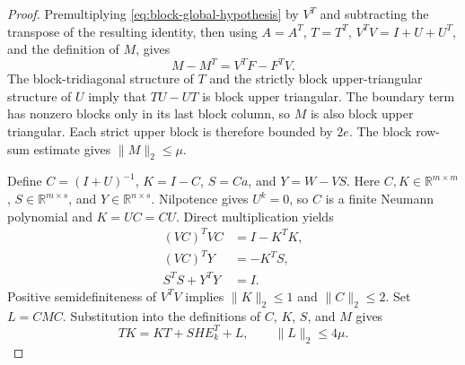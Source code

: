 \documentclass[11pt]{article}
\theoremstyle{definition}
\newcommand{\R}{\mathbb{R}}
\begin{document}
\begin{proof}
Premultiplying \eqref{eq:block-global-hypothesis} by $V^T$ and subtracting the
transpose of the resulting identity, then using $A=A^T$, $T=T^T$,
$V^TV=I+U+U^T$, and the definition of $M$, gives
\begin{equation}
 M-M^T=V^TF-F^TV.
 \label{eq:block-commutator}
\end{equation}
The block-tridiagonal structure of $T$ and the strictly block upper-triangular
structure of $U$ imply that $TU-UT$ is block upper triangular.
The boundary term has nonzero blocks only in its last block column, so
$M$ is also block upper triangular. Each
strict upper block is therefore bounded by $2e$.  The block row-sum estimate
gives $\|M\|_2\le\mu$.

Define $C=(I+U)^{-1}$, $K=I-C$, $S=Ca$, and $Y=W-VS$.
Here $C,K\in\R^{m\times m}$, $S\in\R^{m\times s}$, and $Y\in\R^{n\times s}$.
Nilpotence gives $U^k=0$, so $C$ is a finite Neumann polynomial and
$K=UC=CU$.  Direct multiplication yields
\begin{equation}
\begin{aligned}
 (VC)^TVC&=I-K^TK,\\
 (VC)^TY&=-K^TS,\\
 S^TS+Y^TY&=I.
\end{aligned}
\label{eq:gram-triple}
\end{equation}
Positive semidefiniteness of $V^TV$ implies $\|K\|_2\le1$ and
$\|C\|_2\le2$.  Set $L=CMC$.  Substitution into the definitions of $C$, $K$,
$S$, and $M$ gives
\begin{equation}
 TK=KT+SHE_k^T+L,
 \qquad \|L\|_2\le4\mu.
 \label{eq:exchange}
\end{equation}


\end{proof}
\end{document}
